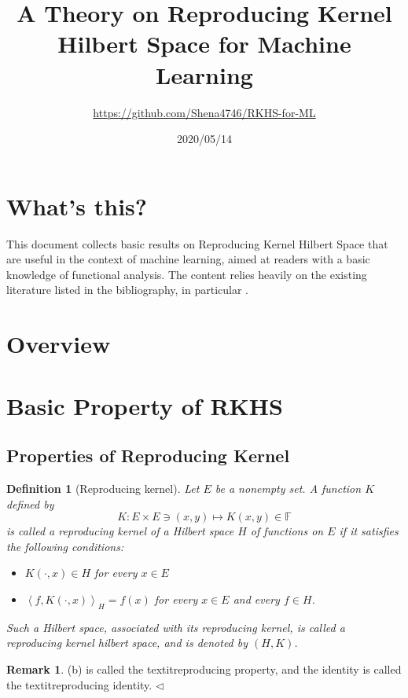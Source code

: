 \documentclass[a4paper,12pt]{article}
\title{A Theory on Reproducing Kernel Hilbert Space for Machine Learning}
\author{\url{https://github.com/Shena4746/RKHS-for-ML}}
\date{2020/05/14}
\newtheorem{dfn}[thm]{Definition}
\theoremstyle{remark}
\theoremstyle{definition}
\newtheorem{rem}[thm]{Remark}
\theoremstyle{definition}
\theoremstyle{definition}
\newcommand{\ip}[2]{\left<#1, #2 \right>}
\newcommand{\fin}{\hfill \( \triangleleft \) }
\begin{document}
\maketitle
\section*{What's this?}
This document collects basic results on Reproducing Kernel Hilbert Space that are useful in the context of machine learning, aimed at readers with a basic knowledge of functional analysis. The content relies heavily on the existing literature listed in the bibliography, in particular \cite{Berlinet:RKHS} \cite{Christmann-Steinwart:SVM}.
\cite{Cucker-Zhou:Learning-Theory}
\cite{Paulsen-Raghupathi:Intro-RKHS}
\cite{Schlkopf-Smola:Learning-with-kernels}

\section*{Overview}

\tableofcontents
\clearpage
\section{Basic Property of RKHS}
\subsection{Properties of Reproducing Kernel}
\begin{dfn}[Reproducing kernel]
	Let \( E \) be a nonempty set. A function \( K \) defined by
	\[
		K:E \times E \ni (x,y) \mapsto K(x,y) \in \mathbb{F}
	\]
	is called a reproducing kernel of a Hilbert space \( H \) of functions on \( E \) if it satisfies the following conditions:
	\begin{itemize}
		\item[(a)] \( K(\cdot, x) \in H \) for every \( x \in E \)
		\item[(b)]  \( \ip{f}{K(\cdot, x)}_H = f(x) \) for every \( x \in E \) and every \( f \in H \).
	\end{itemize}
	Such a Hilbert space, associated with its reproducing kernel, is called a reproducing kernel hilbert space, and is denoted by \( (H,K) \).
\end{dfn}

\begin{rem}
	(b) is called the textit{reproducing property}, and the identity is called the textit{reproducing identity}.
	\fin\end{rem}
\end{document}

